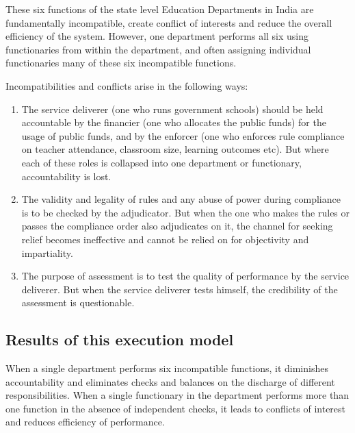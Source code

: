 \documentclass[a4paper, 12pt, twoside]{article}
\begin{document}
These six functions of the state level Education Departments in India are fundamentally incompatible, create conflict of interests and reduce the overall efficiency of the system. However, one department performs all six using functionaries from within the department, and often assigning individual functionaries many of these six incompatible functions. 

Incompatibilities and conflicts arise in the following ways:

\begin{enumerate}

\item The service deliverer (one who runs government schools) should be held accountable by the financier (one who allocates the public funds) for the usage of public funds, and by the enforcer (one who enforces rule compliance on teacher attendance, classroom size, learning outcomes etc). But where each of these roles is collapsed into one department or functionary, accountability is lost.

\item The validity and legality of rules and any abuse of power during compliance is to be checked by the adjudicator. But when the one who makes the rules or passes the compliance order also adjudicates on it, the channel for seeking relief becomes ineffective and cannot be relied on for objectivity and impartiality. 

\item The purpose of assessment is to test the quality of performance by the service deliverer. But when the service deliverer tests himself, the credibility of the assessment is questionable.

\end{enumerate}          
 
\subsection*{Results of this execution model} 

When a single department performs six incompatible functions, it diminishes accountability and eliminates checks and balances on the discharge of different responsibilities. When a single functionary in the department performs more than one function in the absence of independent checks, it leads to conflicts of interest and reduces efficiency of performance. 
\end{document}
